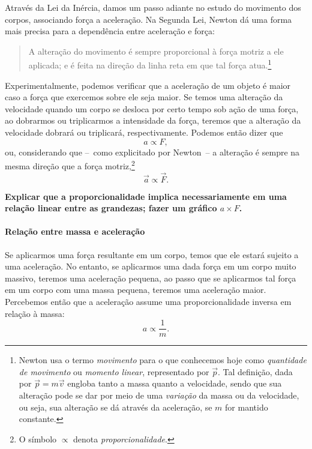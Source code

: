 Através da Lei da Inércia, damos um passo adiante no estudo do movimento dos corpos, associando força a aceleração. Na Segunda Lei, Newton dá uma forma mais precisa para a dependência entre aceleração e força:
\begin{quote}
  A alteração do movimento é sempre proporcional à força motriz a ele aplicada; e é feita na direção da linha reta em que tal força atua.\footnote{Newton usa o termo \emph{movimento} para o que conhecemos hoje como \emph{quantidade de movimento} ou \emph{momento linear}, representado por $\vec{p}$. Tal definição, dada por $\vec{p} = m\vec{v}$ engloba tanto a massa quanto a velocidade, sendo que sua alteração pode se dar por meio de uma \emph{variação} da massa ou da velocidade, ou seja, sua alteração se dá através da aceleração, se $m$ for mantido constante.}
\end{quote}
%
Experimentalmente, podemos verificar que a aceleração de um objeto é maior caso a força que exercemos sobre ele seja maior. Se temos uma alteração da velocidade quando um corpo se desloca por certo tempo sob ação de uma força, ao dobrarmos ou triplicarmos a intensidade da força, teremos que a alteração da velocidade dobrará ou triplicará, respectivamente. Podemos então dizer que
\begin{equation}
  a \propto F,
\end{equation}
%
ou, considerando que --~como explicitado por Newton~-- a alteração é sempre na mesma direção que a força motriz,\footnote{O símbolo $\propto$ denota \emph{proporcionalidade}.}
\begin{equation}
    \vec{a} \propto \vec{F}.
\end{equation}

\textbf{Explicar que a proporcionalidade implica necessariamente em uma relação linear entre as grandezas; fazer um gráfico $a \times F$.}

\paragraph{Relação entre massa e aceleração}

Se aplicarmos uma força resultante em um corpo, temos que ele estará sujeito a uma aceleração. No entanto, se aplicarmos uma dada força em um corpo muito massivo, teremos uma aceleração pequena, ao passo que se aplicarmos tal força em um corpo com uma massa pequena, teremos uma aceleração maior. Percebemos então que a aceleração assume uma proporcionalidade inversa em relação à massa:
\begin{equation}
  a \propto \frac{1}{m}.
\end{equation}

